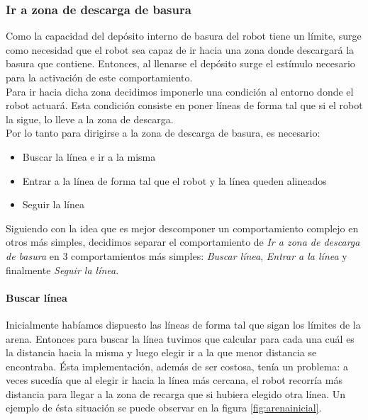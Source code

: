 \subsubsection{Ir a zona de descarga de basura}
\label{go_to_unload_zone}
Como la capacidad del dep\'osito interno de basura del robot tiene un l\'imite, 
surge como necesidad que el robot sea capaz de ir hacia una zona donde
descargar\'a la basura que contiene. Entonces, al llenarse el dep\'osito
surge el est\'imulo necesario para la activaci\'on de este comportamiento.
\\\indent
Para ir hacia dicha zona decidimos imponerle una condici\'on al
entorno donde el robot actuar\'a. Esta condici\'on consiste en poner l\'ineas
de forma tal que si el robot la sigue, lo lleve a la zona de descarga.
\\\indent
Por lo tanto para dirigirse a la zona de descarga de basura, es necesario:
\begin{itemize}
	\item Buscar la l\'inea e ir a la misma
	\item Entrar a la l\'inea de forma tal que el robot y la l\'inea queden
				alineados
	\item Seguir la l\'inea
\end{itemize}
Siguiendo con la idea que es mejor descomponer un comportamiento complejo en
otros m\'as simples, decidimos separar el comportamiento de \emph{Ir a zona de
descarga de basura} en 3 comportamientos m\'as simples: \emph{Buscar l\'inea},
\emph{Entrar a la l\'inea} y finalmente \emph{Seguir la l\'inea}.

\paragraph{Buscar l\'inea}
\label{find_line}
Inicialmente hab\'iamos dispuesto las l\'ineas de forma tal que sigan los
l\'imites de la arena. Entonces para buscar la l\'inea tuvimos que calcular
para cada una cu\'al es la distancia hacia la misma y luego elegir ir a la
que menor distancia se encontraba. \'Esta implementaci\'on, adem\'as de ser
costosa, ten\'ia un problema: a veces suced\'ia que al elegir ir hacia la
l\'inea m\'as cercana, el robot recorr\'ia m\'as distancia para llegar a la
zona de recarga que si hubiera elegido otra l\'inea. Un ejemplo de \'esta
situaci\'on se puede observar en la figura \ref{fig:arenainicial}.

